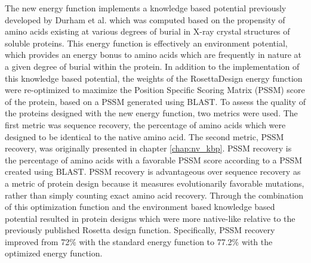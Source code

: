 The new energy function implements a knowledge based potential previously developed by Durham et al.\citep{Durham:2009kt} which was computed based on the propensity of amino acids existing at various degrees of burial in X-ray crystal structures of soluble proteins.
This energy function is effectively an environment potential, which provides an energy bonus to amino acids which are frequently in nature at a given degree of burial within the protein.
In addition to the implementation of this knowledge based potential, the weights of the RosettaDesign energy function were re-optimized to maximize the Position Specific Scoring Matrix (PSSM) score of the protein, based on a PSSM generated using BLAST.
To assess the quality of the proteins designed with the new energy function, two metrics were used.
The first metric was sequence recovery\citep{Kuhlman:2000tc}, the percentage of amino acids which were designed to be identical to the native amino acid.
The second metric, PSSM recovery, was originally presented in chapter \ref{chap:nv_kbp}.
PSSM recovery is the percentage of amino acids with a favorable PSSM score according to a PSSM created using BLAST.
PSSM recovery is advantageous over sequence recovery as a metric of protein design because it measures evolutionarily favorable mutations, rather than simply counting exact amino acid recovery.
Through the combination of this optimization function and the environment based knowledge based potential resulted in protein designs which were more native-like relative to the previously published Rosetta design function.
Specifically, PSSM recovery improved from 72\% with the standard energy function to 77.2\% with the optimized energy function.

